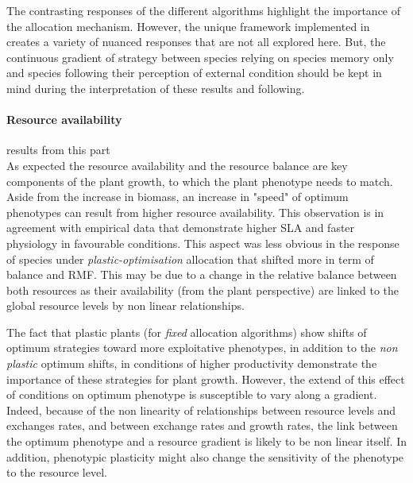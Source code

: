 The contrasting responses of the different algorithms highlight the importance of the allocation mechanism. However, the unique framework implemented in \model creates a variety of nuanced responses that are not all explored here. But, the continuous gradient of strategy between species relying on species memory only and species following their perception of external condition should be kept in mind during the interpretation of these results and following.
%
%

\paragraph{Resource availability}

results from this part\\
As expected the resource availability and the resource balance are key components of the plant growth, to which the plant phenotype needs to match. Aside from the increase in biomass, an increase in "speed" of optimum phenotypes can result from higher resource availability. This observation is in agreement with empirical data that demonstrate higher SLA and faster physiology in favourable conditions. This aspect was less obvious in the response of species under \textit{plastic-optimisation} allocation that shifted more in term of balance and RMF. This may be due to a change in the relative balance between both resources as their availability (from the plant perspective) are linked to the global resource levels by non linear relationships.

The fact that plastic plants (for \textit{fixed} allocation algorithms) show shifts of optimum strategies toward more exploitative phenotypes, in addition to the \textit{non plastic} optimum shifts, in conditions of higher productivity demonstrate the importance of these strategies for plant growth. However, the extend of this effect of conditions on optimum phenotype is susceptible to vary along a gradient. Indeed, because of the non linearity of relationships between resource levels and exchanges rates, and between exchange rates and growth rates, the link between the optimum phenotype and a resource gradient is likely to be non linear itself. In addition, phenotypic plasticity might also change the sensitivity of the phenotype to the resource level.

